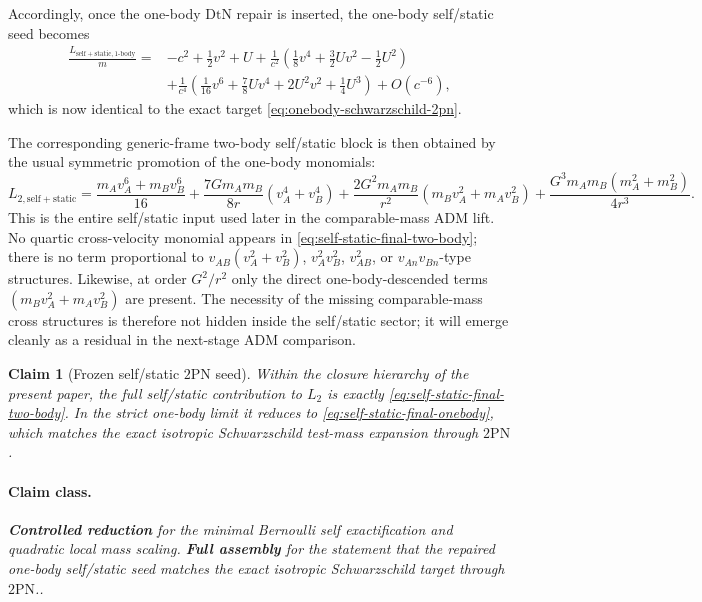 \documentclass[11pt]{article}
\newcommand{\TwoPN}{\mathrm{2PN}}
\newcommand{\ADM}{\mathrm{ADM}}
\newcommand{\DtN}{\mathrm{DtN}}
\newcommand{\Controlled}{\textbf{Controlled reduction}}
\newcommand{\FullMatch}{\textbf{Full assembly}}
\newcommand{\claimclass}[1]{\paragraph{Claim class.}\emph{#1.}}
\newtheorem{claim}{Claim}
\begin{document}
Accordingly, once the one-body \(\DtN\) repair is inserted, the one-body self/static
seed becomes
\begin{align}
\frac{L_{\mathrm{self}+\mathrm{static},1\text{-}\mathrm{body}}}{m}
={}&-c^2+\frac12 v^2+U
+\frac{1}{c^2}\left(\frac18 v^4+\frac32 Uv^2-\frac12 U^2\right)
\nonumber\\
&
+\frac{1}{c^4}\left(\frac1{16}v^6+\frac78 Uv^4+2U^2v^2+\frac14 U^3\right)
+O(c^{-6}),
\label{eq:self-static-final-onebody}
\end{align}
which is now identical to the exact target
\cref{eq:onebody-schwarzschild-2pn}.

The corresponding generic-frame two-body self/static block is then obtained by the usual
symmetric promotion of the one-body monomials:
\begin{equation}
L_{2,\mathrm{self}+\mathrm{static}}=
\frac{m_A v_A^6+m_B v_B^6}{16}
+\frac{7Gm_A m_B}{8r}(v_A^4+v_B^4)
+\frac{2G^2m_A m_B}{r^2}(m_B v_A^2+m_A v_B^2)
+\frac{G^3m_A m_B(m_A^2+m_B^2)}{4r^3}.
\label{eq:self-static-final-two-body}
\end{equation}
This is the entire self/static input used later in the comparable-mass \(\ADM\) lift.
No quartic cross-velocity monomial appears in \cref{eq:self-static-final-two-body};
there is no term proportional to \(v_{AB}(v_A^2+v_B^2)\), \(v_A^2v_B^2\),
\(v_{AB}^2\), or \(v_{An}v_{Bn}\)-type structures.  Likewise, at order \(G^2/r^2\)
only the direct one-body-descended terms
\((m_B v_A^2+m_A v_B^2)\) are present.  The necessity of the missing comparable-mass
cross structures is therefore not hidden inside the self/static sector; it will emerge
cleanly as a residual in the next-stage \(\ADM\) comparison.

\begin{claim}[Frozen self/static \texorpdfstring{$2$}{2}PN seed]
\label{clm:self-static-seed}
Within the closure hierarchy of the present paper, the full self/static contribution to
\(L_2\) is exactly \cref{eq:self-static-final-two-body}.  In the strict one-body limit
it reduces to \cref{eq:self-static-final-onebody}, which matches the exact isotropic
Schwarzschild test-mass expansion through \(\TwoPN\).
\end{claim}

\claimclass{\Controlled{} for the minimal Bernoulli self exactification and quadratic
local mass scaling.
\FullMatch{} for the statement that the repaired one-body self/static seed matches the
exact isotropic Schwarzschild target through \(\TwoPN\).}
\end{document}
